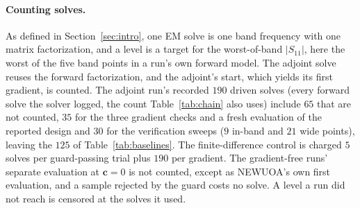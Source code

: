 \documentclass{anvil-paper}
\begin{document}
\paragraph{Counting solves.}
As defined in Section~\ref{sec:intro}, one EM solve is one band frequency
with one matrix factorization, and a level is a target for the worst-of-band
$|S_{11}|$, here the worst of the five band points in a run's own forward
model. The adjoint solve reuses the forward factorization, and the adjoint's
start, which yields its first gradient, is counted. The adjoint run's
recorded $190$ driven solves (every forward solve the solver logged, the
count Table~\ref{tab:chain} also uses) include $65$ that are not counted,
$35$ for the three gradient checks and a fresh evaluation of the reported
design and $30$ for the verification sweeps ($9$ in-band and $21$ wide
points), leaving the $125$ of Table~\ref{tab:baselines}. The
finite-difference control is charged $5$ solves per guard-passing trial plus
$190$ per gradient. The gradient-free runs' separate evaluation at
$\mathbf{c} = 0$ is not counted, except as NEWUOA's own first evaluation, and
a sample rejected by the guard costs no solve. A level a run did not reach
is censored at the solves it used.
\end{document}
